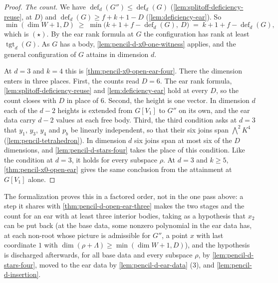\begin{proof}
  \emph{The count.} We have
  $\operatorname{def}_d(G'') \le \operatorname{def}_d(G)$
  (\cref{lem:splitoff-deficiency-reuse}, at $D$) and
  $\operatorname{def}_d(G) \ge f + k + 1 - D$ (\cref{lem:deficiency-ear}).
  So
  \[
    \min(\dim W + 1, D) \;\ge\;
    \min\bigl(k + 1 + f - \operatorname{def}_d(G),\ D\bigr)
    \;=\; k + 1 + f - \operatorname{def}_d(G),
  \]
  which is $(\star)$. By the ear rank formula at $G$ the configuration
  has rank at least $\operatorname{tgt}_d(G)$. As $G$ has a body,
  \cref{lem:pencil-d-x0-one-witness} applies, and the general
  configuration of $G$ attains in dimension $d$.

  At $d = 3$ and $k = 4$ this is \cref{thm:pencil-x0-open-ear-four}.
  There the dimension enters in three places. First, the counts read
  $D = 6$. The ear rank formula, \cref{lem:splitoff-deficiency-reuse} and
  \cref{lem:deficiency-ear} hold at every $D$, so the count closes with
  $D$ in place of $6$. Second, the height is one vector. In dimension $d$
  each of the $d - 2$ heights is extended from $G[V_1]$ to $G''$ on its
  own, and the ear data carry $d - 2$ values at each free body. Third,
  the third condition asks at $d = 3$ that $y_1$, $y_3$, $y_4$ and $p_b$
  be linearly independent, so that their six joins span
  $\bigwedge^2 K^4$ (\cref{lem:pencil-tetrahedron}). In dimension $d$ six
  joins span at most six of the $D$ dimensions, and
  \cref{lem:pencil-d-stars-four} takes the place of this condition. Like
  the condition at $d = 3$, it holds for every subspace $\rho$. At $d = 3$
  and $k \ge 5$, \cref{thm:pencil-x0-open-ear} gives the same conclusion
  from the attainment at $G[V_1]$ alone.
\end{proof}

\begin{fmlnote}
  The formalization proves this in a factored order, not in the one pass
  above: a step it shares with \cref{thm:pencil-d-open-ear-three} makes
  the two stages and the count for an ear with at least three interior
  bodies, taking as a hypothesis that $x_2$ can be put back (at the base
  data, some nonzero polynomial in the ear data has, at each non-root
  whose picture is admissible for $G''$, a point $x$ with last
  coordinate $1$ with $\dim(\rho + \Lambda) \ge \min(\dim W + 1, D)$),
  and the hypothesis is discharged afterwards, for all base data and
  every subspace $\rho$, by \cref{lem:pencil-d-stars-four}, moved to the
  ear data by \cref{lem:pencil-d-ear-data} (3), and
  \cref{lem:pencil-d-insertion}.
\end{fmlnote}

